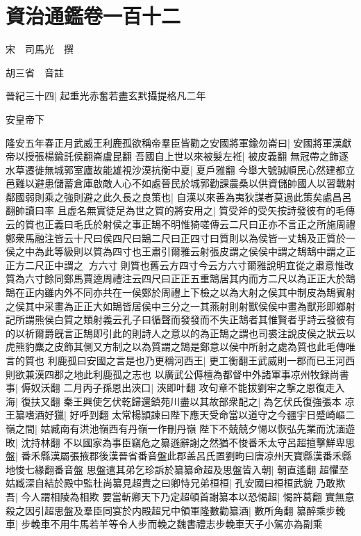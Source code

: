 \section{資治通鑑卷一百十二}


宋　司馬光　撰

胡三省　音註

晉紀三十四|{
	起重光赤奮若盡玄黓攝提格凡二年}


安皇帝下

隆安五年春正月武威王利鹿孤欲稱帝羣臣皆勸之安國將軍鍮勿崙曰|{
	安國將軍漢獻帝以授張楊鍮託侯翻崙盧昆翻}
吾國自上世以來被髮左袵|{
	被皮義翻}
無冠帶之飾逐水草遷徙無城郭室廬故能雄視沙漠抗衡中夏|{
	夏戶雅翻}
今舉大號誠順民心然建都立邑難以避患儲蓄倉庫啟敵人心不如處晉民於城郭勸課農桑以供資儲帥國人以習戰射鄰國弱則乘之強則避之此久長之良策也|{
	自漢以來善為夷狄謀者莫過此策矣處昌呂翻帥讀曰率}
且虚名無實徒足為世之質的將安用之|{
	質受斧的受矢按詩發彼有的毛傳云的質也正義曰毛氏於射侯之事正鵠不明惟猗嗟傳云二尺曰正亦不言正之所施周禮鄭衆馬融注皆云十尺曰侯四尺曰鵠二尺曰正四寸曰質則以為侯皆一丈鵠及正質於一侯之中為此等級則以質為四寸也王肅引爾雅云射張皮謂之侯侯中謂之鵠鵠中謂之正正方二尺正中謂之方六寸則質也舊云方四寸今云方六寸爾雅說明宜從之肅意惟改質為六寸餘同鄭馬賈逵周禮注云四尺曰正正五重鵠居其内而方二尺以為正正大於鵠鵠在正内雖内外不同亦共在一侯鄭於周禮上下檢之以為大射之侯其中制皮為鵠賓射之侯其中采畫為正正大如鵠皆居侯中三分之一其燕射則射獸侯侯中畫為獸形即鄉射記所謂熊侯白質之類射義云孔子曰循聲而發發而不失正鵠者其惟賢者乎詩云發彼有的以祈爾爵旣言正鵠即引此的則詩人之意以的為正鵠之謂也司裘注說皮侯之狀云以虎熊豹麋之皮飾其側又方制之以為質謂之鵠是鄭意以侯中所射之處為質也此毛傳唯言的質也}
利鹿孤曰安國之言是也乃更稱河西王|{
	更工衡翻王武威則一郡而已王河西則欲兼漢四郡之地此利鹿孤之志也}
以廣武公傉檀為都督中外諸軍事凉州牧録尚書事|{
	傉奴沃翻}
二月丙子孫恩出浹口|{
	浹即叶翻}
攻句章不能拔劉牢之撃之恩復走入海|{
	復扶又翻}
秦王興使乞伏乾歸還鎮苑川盡以其故部衆配之|{
	為乞伏氏復強張本}
凉王纂嗜酒好獵|{
	好呼到翻}
太常楊頴諫曰陛下應天受命當以道守之今疆宇日蹙崎嶇二嶺之間|{
	姑臧南有洪池嶺西有丹嶺一作刪丹嶺}
陛下不兢兢夕愓以恢弘先業而沈湎遊畋|{
	沈持林翻}
不以國家為事臣竊危之纂遜辭謝之然猶不悛番禾太守呂超擅擊鮮卑思盤|{
	番禾縣漢屬張掖郡後漢晉省番音盤此郡盖呂氏置劉昫曰唐凉州天寶縣漢番禾縣地悛七緣翻番音盤}
思盤遣其弟乞珍訴於纂纂命超及思盤皆入朝|{
	朝直遙翻}
超懼至姑臧深自結於殿中監杜尚纂見超責之曰卿恃兄弟桓桓|{
	孔安國曰桓桓武貌}
乃敢欺吾|{
	今人謂相陵為相欺}
要當斬卿天下乃定超頓首謝纂本以恐愒超|{
	愒許葛翻}
實無意殺之因引超思盤及羣臣同宴於内殿超兄中領軍隆數勸纂酒|{
	數所角翻}
纂醉乘步輓車|{
	步輓車不用牛馬若羊等令人步而輓之魏書禮志步輓車天子小駕亦為副乘}
